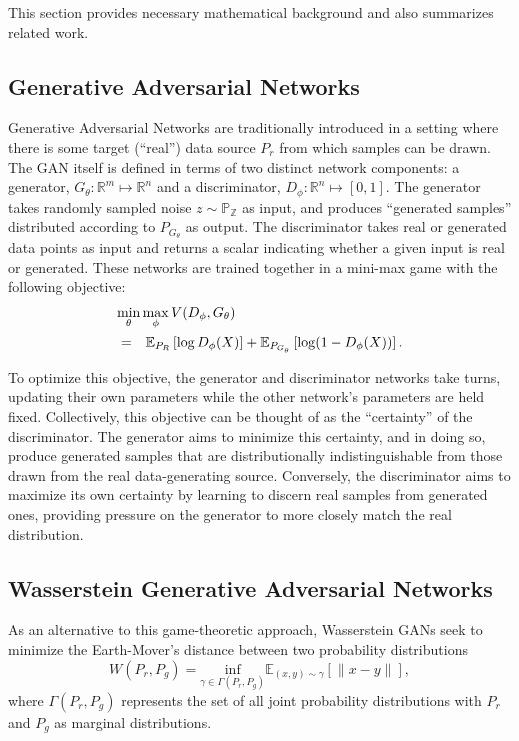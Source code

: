\documentclass[letterpaper]{article} %
\begin{document}
This section provides necessary mathematical background and also summarizes related work.

\subsection{Generative Adversarial Networks}

Generative Adversarial Networks are traditionally introduced in a setting where there is some target (``real'') data source $P_r$ from which samples can be drawn. The GAN itself is defined in terms of two distinct network components: a generator, $G_\theta : \mathbb{R}^m \mapsto \mathbb{R}^n$ and a discriminator, $D_\phi : \mathbb{R}^n \mapsto [0, 1]$. The generator takes randomly sampled noise $z \sim \mathbb{P_Z}$ as input, and produces ``generated samples'' distributed according to $P_{G_\theta}$ as output. The discriminator takes real or generated data points as input and returns a scalar indicating whether a given input is real or generated. These networks are trained together in a mini-max game with the following objective:
\begin{eqnarray}\label{eq:gan_minimax}
\lefteqn{\min_{\theta}\max_{\phi} V(D_\phi, G_\theta)}\\
&=& \mathbb{E}_{P_R}\left[\log D_\phi(X)\right] + \mathbb{E}_{P_{G_\theta}}\left[ \log(1 - D_\phi(X))\right]. \nonumber
\end{eqnarray}

To optimize this objective, the generator and discriminator networks take turns, updating their own parameters while the other network's parameters are held fixed. Collectively, this objective can be thought of as the ``certainty'' of the discriminator. The generator aims to minimize this certainty, and in doing so, produce generated samples that are distributionally indistinguishable from those drawn from the real data-generating source. Conversely, the discriminator aims to maximize its own certainty by learning to discern real samples from generated ones, providing pressure on the generator to more closely match the real distribution.

\subsection{Wasserstein Generative Adversarial Networks}

As an alternative to this game-theoretic approach, Wasserstein GANs seek to minimize the Earth-Mover's distance
between two probability distributions
\begin{equation}\label{eq:earth-movers}
W(P_r, P_g) = \underset{\gamma \in \Gamma(P_r, P_g)}{\text{inf}} \mathbb{E}_{(x, y) \sim \gamma}\left[ \| x - y \| \right],
\end{equation}
where $\Gamma(P_r, P_g)$ represents the set of all joint probability distributions with $P_r$ and $P_g$ as marginal distributions.
\end{document}
